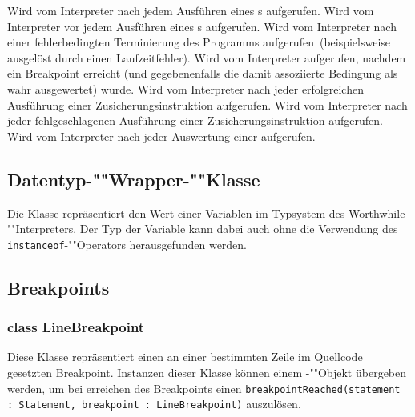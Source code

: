 \begin{description}
    Wird vom Interpreter nach jedem Ausführen eines s aufgerufen.
    Wird vom Interpreter vor jedem Ausführen eines s aufgerufen.
    Wird vom Interpreter nach einer fehlerbedingten Terminierung des Programms aufgerufen~(beispielsweise ausgelöst durch einen Laufzeitfehler).
    Wird vom Interpreter aufgerufen, nachdem ein Breakpoint erreicht (und gegebenenfalls die damit assoziierte Bedingung als wahr ausgewertet) wurde.
    Wird vom Interpreter nach jeder erfolgreichen Ausführung einer Zusicherungsinstruktion aufgerufen.
    Wird vom Interpreter nach jeder fehlgeschlagenen Ausführung einer Zusicherungsinstruktion aufgerufen.
    Wird vom Interpreter nach jeder Auswertung einer  aufgerufen.
\end{description}

\subsection{Datentyp-""Wrapper-""Klasse }
Die Klasse  repräsentiert den Wert einer Variablen im Typsystem des Worthwhile-""Interpreters. Der Typ der Variable kann dabei auch ohne die Verwendung des \texttt{instanceof}-""Operators herausgefunden werden.

\subsection{Breakpoints}
\subsubsection{class LineBreakpoint}
Diese Klasse repräsentiert einen an einer bestimmten Zeile im Quellcode gesetzten Breakpoint. Instanzen dieser Klasse können einem -""Objekt übergeben werden, um bei erreichen des Breakpoints einen \texttt{breakpointReached(statement : Statement, breakpoint : LineBreakpoint)} auszulösen.

